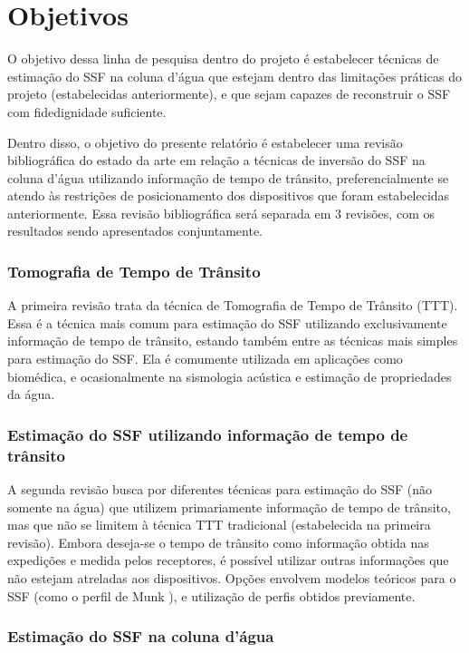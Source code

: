 \section{Objetivos}

O objetivo dessa linha de pesquisa dentro do projeto é estabelecer técnicas de estimação do SSF na coluna d'água que estejam dentro das limitações práticas do projeto (estabelecidas anteriormente), e que sejam capazes de reconstruir o SSF com fidedignidade suficiente.

Dentro disso, o objetivo do presente relatório é estabelecer uma revisão bibliográfica do estado da arte em relação a técnicas de inversão do SSF na coluna d'água utilizando informação de tempo de trânsito, preferencialmente se atendo às restrições de posicionamento dos dispositivos que foram estabelecidas anteriormente. Essa revisão bibliográfica será separada em 3 revisões, com os resultados sendo apresentados conjuntamente.

\subsubsection*{Tomografia de Tempo de Trânsito}

A primeira revisão trata da técnica de \gls{Tomografia de Tempo de Trânsito} (TTT). Essa é a técnica mais comum para estimação do SSF utilizando exclusivamente informação de tempo de trânsito, estando também entre as técnicas mais simples para estimação do SSF. Ela é comumente utilizada em aplicações como biomédica, e ocasionalmente na sismologia acústica e estimação de propriedades da água.

\subsubsection*{Estimação do SSF utilizando informação de tempo de trânsito}

A segunda revisão busca por diferentes técnicas para estimação do SSF (não somente na água) que utilizem primariamente informação de tempo de trânsito, mas que não se limitem à técnica TTT tradicional (estabelecida na primeira revisão). Embora deseja-se o tempo de trânsito como informação obtida nas expedições e medida pelos receptores, é possível utilizar outras informações que não estejam atreladas aos dispositivos. Opções envolvem modelos teóricos para o SSF (como o perfil de Munk \cite{munk_sound_1974}), e utilização de perfis obtidos previamente.

\subsubsection*{Estimação do SSF na coluna d'água}

